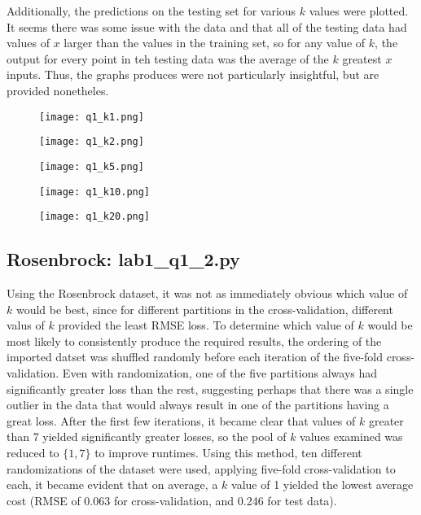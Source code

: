 \documentclass{article}
\begin{document}
Additionally, the predictions on the testing set for various $k$ values were plotted. It seems there was some issue with the data and that all of the testing data had values of $x$ larger than the values in the training set, so for any value of $k$, the output for every point in teh testing data was the average of the $k$ greatest $x$ inputs. Thus, the graphs produces were not particularly insightful, but are provided nonetheles.

\begin{figure}[h]
\texttt{[image: q1\_k1.png]}
\centering
\end{figure}

\begin{figure}[p]
\texttt{[image: q1\_k2.png]}
\centering
\end{figure}


\begin{figure}[p]
\texttt{[image: q1\_k5.png]}
\centering
\end{figure}

\begin{figure}[p]
\texttt{[image: q1\_k10.png]}
\centering
\end{figure}

\begin{figure}[h !]
\texttt{[image: q1\_k20.png]}
\centering
\end{figure}
\pagebreak

\subsection{Rosenbrock: lab1\_q1\_2.py}
Using the Rosenbrock dataset, it was not as immediately obvious which value of $k$ would be best, since for different partitions in the cross-validation, different valus of $k$ provided the least RMSE loss. To determine which value of $k$ would be most likely to consistently produce the required results, the ordering of the imported datset was shuffled randomly before each iteration of the five-fold cross-validation. Even with randomization, one of the five partitions always had significantly greater loss than the rest, suggesting perhaps that there was a single outlier in the data that would always result in one of the partitions having a great loss. After the first few iterations, it became clear that values of $k$ greater than 7 yielded significantly greater losses, so the pool of $k$ values examined was reduced to $\{1,7\}$ to improve runtimes. Using this method, ten different randomizations of the dataset were used, applying five-fold cross-validation to each, it became evident that on average, a $k$ value of 1 yielded the lowest average cost (RMSE of 0.063 for cross-validation, and 0.246 for test data).
\end{document}
